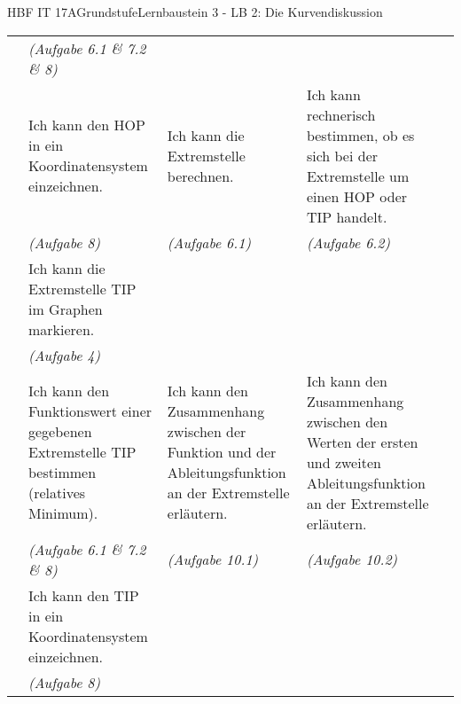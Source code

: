 \documentclass[oneside,openany,headings=optiontotoc,12pt,numbers=noenddot]{scrreprt}
\begin{document}
\begin{worksheet}{HBF IT 17A}{Grundstufe}{Lernbaustein 3 - LB 2: Die Kurvendiskussion}
\begin{framed}
\begin{tabularx}{\textwidth}{l|X|X|X|X|}
				& \textit{(Aufgabe 6.1 \& 7.2 \& 8)} & & &\\
				\cline{2-4}
				& Ich kann den HOP in ein Koordinatensystem einzeichnen. &  Ich kann die Extremstelle berechnen. & Ich kann rechnerisch bestimmen, ob es sich bei der Extremstelle um einen HOP oder TIP handelt. &\\
				& \textit{(Aufgabe 8)} & \textit{(Aufgabe 6.1)} & \textit{(Aufgabe 6.2)} & \\
				\hhline{=|=|~|~|=}
				& Ich kann die Extremstelle TIP im Graphen markieren.& & & \\
				& \textit{(Aufgabe 4)} & & & \\
				\cline{2-4}
				\multirow{2}{*}{\tabrotate{Extremstelle TIP}}
				& Ich kann den Funktionswert einer gegebenen Extremstelle TIP bestimmen  (\colorbox{blue!5}{relatives Minimum}).& Ich kann den Zusammenhang zwischen der Funktion und der Ableitungsfunktion an der Extremstelle erläutern. & Ich kann den Zusammenhang zwischen den Werten der ersten und zweiten Ableitungsfunktion an der Extremstelle erläutern. &\\
				& \textit{(Aufgabe 6.1 \& 7.2 \& 8)} & \textit{(Aufgabe 10.1)} & \textit{(Aufgabe 10.2)} & \\
				\cline{2-2}
				& Ich kann den TIP in ein Koordinatensystem einzeichnen. & & &\\
				& \textit{(Aufgabe 8)} & & &\\
				\hline\hline
				

\end{tabularx}
\end{framed}
\end{worksheet}
\end{document}

